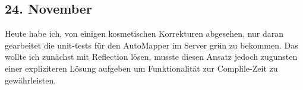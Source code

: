 \subsection{24. November}
Heute habe ich, von einigen kosmetischen Korrekturen abgesehen, nur daran gearbeitet die unit-tests für den AutoMapper im Server grün zu bekommen. Das wollte ich zunächst mit Reflection lösen, musste diesen Ansatz jedoch zugunsten einer expliziteren Lösung aufgeben um Funktionalität zur Complile-Zeit zu gewährleisten.